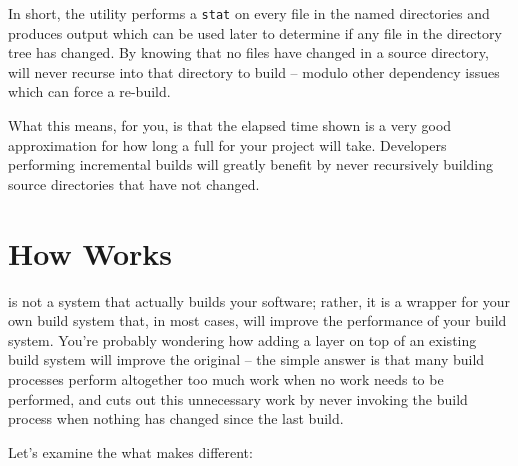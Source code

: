In short, the \mtree utility performs a \texttt{stat} on every file in
the named directories and produces output which can be used later to
determine if any file in the directory tree has changed.  By knowing
that no files have changed in a source directory, \lmsbw will never
recurse into that directory to build -- modulo other dependency issues
which can force a re-build.

What this means, for you, is that the elapsed time shown is a very
good approximation for how long a full \nullbuild for your project
will take.  Developers performing incremental builds will greatly
benefit by never recursively building source directories that have not
changed.


\section{How \lmsbw Works}

\lmsbw is not a system that actually builds your software; rather, it
is a wrapper for your own build system that, in most cases, will
improve the performance of your build system.  You're probably
wondering how adding a layer on top of an existing build system will
improve the original -- the simple answer is that many build processes
perform altogether too much work when no work needs to be performed,
and \lmsbw cuts out this unnecessary work by never invoking the build
process when nothing has changed since the last build.

Let's examine the what makes \lmsbw different:

